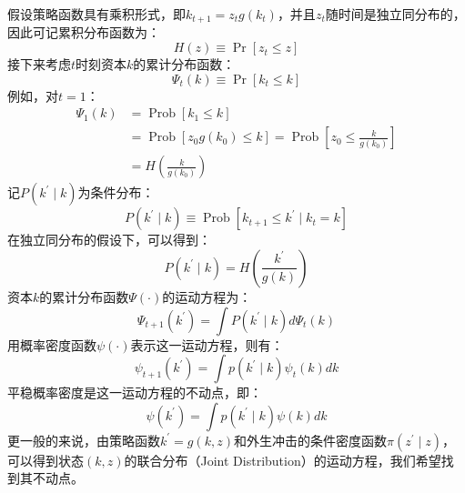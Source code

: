假设策略函数具有乘积形式，即$k_{t+1}=z_tg(k_t)$，并且$z_t$随时间是独立同分布的，因此可记累积分布函数为：
\begin{equation*}
    H(z)\equiv \operatorname{Pr}[z_t\leq z]
\end{equation*}
接下来考虑$t$时刻资本$k$的累计分布函数：
\begin{equation*}
    \Psi_t(k) \equiv \operatorname{Pr}[k_t\leq k]
\end{equation*}
例如，对$t=1$：
\begin{equation*}
    \begin{aligned}
        \Psi_1(k) & =\operatorname{Prob}\left[k_1 \leq k\right] \\
            &= \operatorname{Prob}\left[z_0 g\left(k_0\right) \leq k\right]
                =\operatorname{Prob}\left[z_0 \leq \frac{k}{g\left(k_0\right)}\right] \\
            &= H\left(\frac{k}{g\left(k_0\right)}\right)
    \end{aligned}
\end{equation*}
记$P(k^{\prime}\mid k)$为条件分布：
\begin{equation*}
    P\left(k^{\prime} \mid k\right) \equiv \operatorname{Prob}\left[k_{t+1} \leq k^{\prime} \mid k_t=k\right]
\end{equation*}
在独立同分布的假设下，可以得到：
\begin{equation*}
    P(k^{\prime} \mid k) = H\left(\frac{k^{\prime}}{g(k)}\right)
\end{equation*}
资本$k$的累计分布函数$\Psi(\cdot)$的运动方程为：
\begin{equation*}
    \Psi_{t+1}\left(k^{\prime}\right)=\int P\left(k^{\prime} \mid k\right) d \Psi_t(k)
\end{equation*}
用概率密度函数$\psi(\cdot)$表示这一运动方程，则有：
\begin{equation*}
    \psi_{t+1}\left(k^{\prime}\right)=\int p\left(k^{\prime} \mid k\right) \psi_t(k) dk
\end{equation*}
平稳概率密度是这一运动方程的不动点，即：
\begin{equation*}
    \psi\left(k^{\prime}\right)=\int p\left(k^{\prime} \mid k\right) \psi(k) dk
\end{equation*}
更一般的来说，由策略函数$k^{\prime}=g(k,z)$和外生冲击的条件密度函数$\pi\left(z^{\prime}\mid z\right)$，
可以得到状态$(k,z)$的联合分布（Joint Distribution）的运动方程，我们希望找到其不动点。


